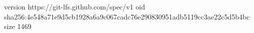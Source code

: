 version https://git-lfs.github.com/spec/v1
oid sha256:4e548a71e9d5cb1928a6a9c067cadc76e290830951adb5119cc3ae22c5d5b4bc
size 1469
